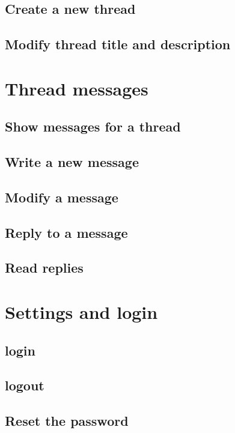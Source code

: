 \documentclass[11pt,a4paper,oneside]{report}
\begin{document}
\subsection{Create a new thread}

\subsection{Modify thread title and description}

\section{Thread messages}

\subsection{Show messages for a thread}

\subsection{Write a new message}

\subsection{Modify a message}

\subsection{Reply to a message}

\subsection{Read replies}

\section{Settings and login}

\subsection{login}

\subsection{logout}

\subsection{Reset the password}
\end{document}
